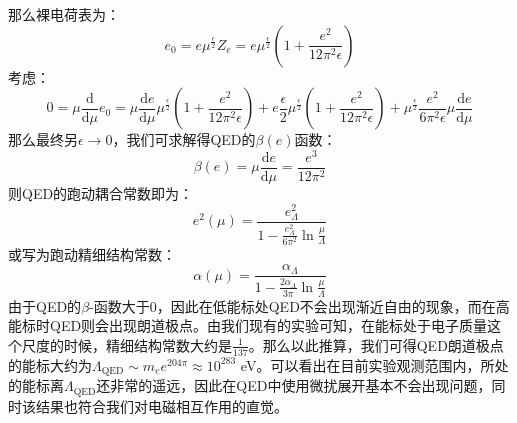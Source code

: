 那么裸电荷表为：
\begin{equation}
    e_0= e\mu^{\frac{\epsilon}{2}}Z_e=e\mu^{\frac{\epsilon}{2}}\left(1+\frac{e^2}{12\pi^2\epsilon}\right)
\end{equation}
考虑：
\begin{equation}
    0=\mu\frac{\mathrm{d}}{\mathrm{d}\mu}e_0=\mu\frac{\mathrm{d}e}{\mathrm{d}\mu}\mu^{\frac{\epsilon}{2}}\left(1+\frac{e^2}{12\pi^2\epsilon}\right)+e\frac{\epsilon}{2}\mu^{\frac{\epsilon}{2}}\left(1+\frac{e^2}{12\pi^2\epsilon}\right)+\mu^{\frac{\epsilon}{2}}\frac{e^2}{6\pi^2\epsilon}\mu\frac{\mathrm{d}e}{\mathrm{d}\mu}
\end{equation}
那么最终另$\epsilon\rightarrow0$，我们可求解得QED的$\beta(e)$函数：
\begin{equation}
    \beta(e)=\mu\frac{\mathrm{d}e}{\mathrm{d}\mu}=\frac{e^3}{12\pi^2}
\end{equation}
则QED的跑动耦合常数即为：
\begin{equation}
    e^2(\mu)=\frac{e_\Lambda^2}{1-\frac{e_\Lambda^2}{6\pi^2}\ln\frac{\mu}{\Lambda}}
\end{equation}
或写为跑动精细结构常数：
\begin{equation}
    \alpha(\mu)=\frac{\alpha_\Lambda}{1-\frac{2\alpha_\Lambda}{3\pi}\ln\frac{\mu}{\Lambda}}
\end{equation}
由于QED的$\beta$-函数大于0，因此在低能标处QED不会出现渐近自由的现象，而在高能标时QED则会出现朗道极点。由我们现有的实验可知，在能标处于电子质量这个尺度的时候，精细结构常数大约是$\frac{1}{137}$。那么以此推算，我们可得QED朗道极点的能标大约为$\Lambda_\text{QED}\sim m_e e^{204\pi}\approx10^{283}$ eV。可以看出在目前实验观测范围内，所处的能标离$\Lambda_\text{QED}$还非常的遥远，因此在QED中使用微扰展开基本不会出现问题，同时该结果也符合我们对电磁相互作用的直觉。

